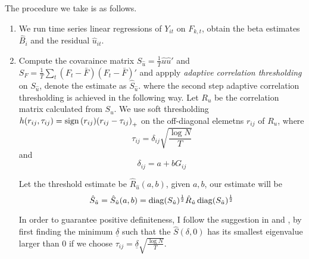 The procedure we take is as follows. 
\begin{enumerate}
    \item We run time series linear regressions of \(Y_{it}\) on \(F_{k,t}\), obtain the beta estimates \(\hat{B}_{i}\) and the residual \(\hat{u}_{it}\). 
    \item Compute the covaraince matrix \(S_{\hat{u}} = \frac{1}{T}\hat{u}\hat{u}'\) and \(S_{F} = \frac{1}{T} \sum_{t} (F_{t} - \bar{F})(F_{t} - \bar{F})'\) and appply \textit{adaptive correlation thresholding} on \(S_{\hat{u}}\), denote the estimate as \(\hat{S}_{\hat{u}}\). 
where the second step adaptive correlation thresholding is achieved in the following way. Let \(R_{u}\) be the correlation matrix calculated from \(S_{u}\). We use soft thresholding \(h(r_{ij}, \tau_{ij}) = \sign\pqty{r_{ij}} \pqty{r_{ij} - \tau_{ij}}_{+}\) on the off-diagonal elemetns \(r_{ij}\) of \(R_{u}\), where 
\begin{equation*}
    \tau_{ij} = \delta_{ij} \sqrt{\frac{\log N}{T}}
\end{equation*}
and 
\begin{equation*}
    \delta_{ij} = a + b G_{ij}
\end{equation*}


Let the threshold estimate be \(\hat{R}_{\hat{u}}(a,b)\), given \(a,b\), our estimate will be
\begin{equation*}
    \hat{S}_{\hat{u}} = \hat{S}_{\hat{u}}(a,b) = \operatorname{diag}(S_{\hat{u}})^{\frac{1}{2}} \hat{R}_{\hat{u}}\operatorname{diag}(S_{\hat{u}})^{\frac{1}{2}}
\end{equation*}

In order to guarantee positive definiteness, I follow the suggestion in \cite{fan2015OverviewEstimation} and \cite{fan2013LargeCovariance}, by first finding the minimum \(\underline{\delta}\) such that the \(\hat{S}(\delta, 0)\) has its smallest eigenvalue larger than \(0\) if we choose \(\tau_{ij} = \underline{\delta} \sqrt{\frac{\log N}{T}}\). 


\end{enumerate}
